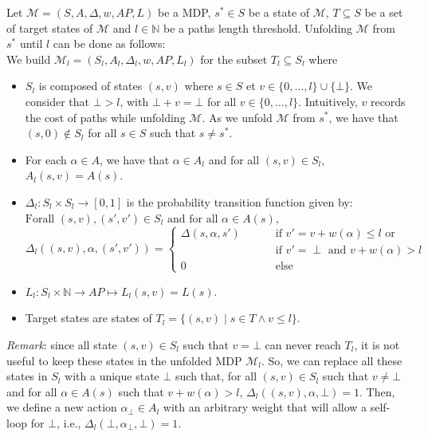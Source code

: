 \begin{definition} Let
  $\mathcal{M} = (S, A, \Delta, w, AP, L)$ be a MDP, $s^* \in S$ be a state of
  $\mathcal{M}$, $T \subseteq S$ be a set of target states of $\mathcal{M}$ and $l \in \mathbb{N}$ be a paths length threshold.
  Unfolding $\mathcal{M}$ from $s^*$ until $l$ can be done as follows: \\
  We build $\mathcal{M}_l = (S_l, A_l, \Delta_l, w, AP, L_l)$ for the subset $T_l \subseteq S_l$ where
  \begin{itemize}
  \item $S_l$ is composed of states $(s, v)$ where $s \in S$ et $v \in \{0, \dots, l\} \cup \{\bot\}$.
  We consider that $\bot > l$, with $\bot + v = \bot$ for all $v \in \{0, \dots, l\}$.
  Intuitively, $v$ records the cost of paths while unfolding $\mathcal{M}$.
  As we unfold $\mathcal{M}$ from $s^*$, we have that
  $(s, 0) \not \in S_l$ for all $s \in S$ such that $s \neq s^*$.
  \item For each $\alpha \in A$, we have that $\alpha \in A_l$ and for all $(s, v) \in S_l$, $A_l(s, v) = A(s)$.
  \item $\Delta_l: S_l \times S_l \rightarrow [0, 1]$ is the probability transition function given by:\\
  $\text{Forall } (s, v), (s', v') \in S_l \text{ and for all } \alpha \in A(s),$
  \[
  \Delta_l((s, v), \alpha, (s', v')) =
  \begin{cases}
  	\Delta(s, \alpha, s') & \quad \quad \text{ if } v' = v + w(\alpha) \leq l \text{ or}\\
  	 & \quad \quad \text{ if } v' = \perp \text{ and } v+w(\alpha) > l \\
  	0 & \quad \quad \text{ else}
  \end{cases}
  \]
  \item $L_l:S_l \times \mathbb{N} \rightarrow AP \mapsto L_l(s, v) = L(s)$.
  \item Target states are states of
  $T_l = \{(s, v) \;|\; s \in T \wedge v \leq l \}$.
  \end{itemize}
  \textit{Remark}: since all state $(s, v) \in S_l$ such that $v = \bot$ can never reach $T_l$, it is not useful to keep these states in the unfolded MDP $\mathcal{M}_l$. So, we can replace all these states in $S_l$ with a unique state $\bot$ such that, for all $(s, v) \in S_l$ such that $v \neq \bot$ and for all $\alpha \in A(s)$ such that $v + w(\alpha) > l$,
  $\Delta_l((s, v), \alpha, \bot) = 1$. Then, we define a new action $\alpha_\bot \in A_l$ with an arbitrary weight that will allow a self-loop for $\bot$, i.e., $\Delta_l(\bot, \alpha_\bot, \bot)=1$.
\end{definition}

